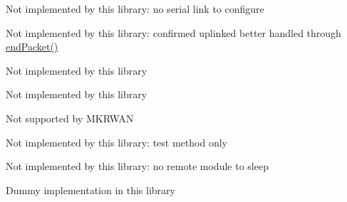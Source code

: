 \begin{DoxyRefList}
 Not implemented by this library\+: no serial link to configure  
\item[Member \mbox{\hyperlink{classSTM32LoRaWAN_a999c98c64e466aedf9fa2e848e684018}{STM32\+Lo\+Ra\+WAN\+::set\+CFM}} (bool cfm)]\label{extensions__extensions000025}%
%
 Not implemented by this library\+: confirmed uplinked better handled through \mbox{\hyperlink{classSTM32LoRaWAN_a816dd9c8b223bda9380971c5a1dab377}{end\+Packet()}}  
\item[Member \mbox{\hyperlink{classSTM32LoRaWAN_a29b18acfa3074157c501122b9399d1d1}{STM32\+Lo\+Ra\+WAN\+::set\+FCD}} (uint16\+\_\+t fcd)]\label{extensions__extensions000015}%
%
 Not implemented by this library  
\item[Member \mbox{\hyperlink{classSTM32LoRaWAN_ab1f8b82511bb880e253f7bdf4e194023}{STM32\+Lo\+Ra\+WAN\+::set\+FCU}} (uint16\+\_\+t fcu)]\label{extensions__extensions000016}%
%
 Not implemented by this library  
\item[Member \mbox{\hyperlink{classSTM32LoRaWAN_aefa957b4339b2da06b292f917ddfed31}{STM32\+Lo\+Ra\+WAN\+::set\+Maintain\+Needed\+Callback}} (std\+::function$<$ void(void)$>$ callback)]\label{extensions__extensions000022}%
%
 Not supported by MKRWAN  
\item[Member \mbox{\hyperlink{classSTM32LoRaWAN_a2eb7351c1b7e8ada59ba58e8032c6a83}{STM32\+Lo\+Ra\+WAN\+::set\+TConf}} (String params)]\label{extensions__extensions000032}%
%
 Not implemented by this library\+: test method only  
\item[Member \mbox{\hyperlink{classSTM32LoRaWAN_a9d332d013d0a2569bc162568adb1bd04}{STM32\+Lo\+Ra\+WAN\+::sleep}} (bool on=true)]\label{extensions__extensions000036}%
%
 Not implemented by this library\+: no remote module to sleep  
\item[Member \mbox{\hyperlink{classSTM32LoRaWAN_ab3dd6a10e89c4e94474b85aa4da0a302}{STM32\+Lo\+Ra\+WAN\+::version}} ()]\label{extensions__extensions000023}%
%
 Dummy implementation in this library 
\end{DoxyRefList}